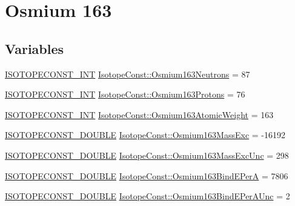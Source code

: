 \hypertarget{group___isotope_const-_osmium-_os163}{}\section{Osmium 163}
\label{group___isotope_const-_osmium-_os163}
\subsection*{Variables}
\begin{DoxyCompactItemize}
\item 
\mbox{\hyperlink{group___isotope_const-_macros_ga5f18360b3e99483a35c32d789e62621c}{I\+S\+O\+T\+O\+P\+E\+C\+O\+N\+S\+T\+\_\+\+I\+NT}} \mbox{\hyperlink{group___isotope_const-_osmium-_os163_ga75f1658134a2aa3621d6da50d4b6484e}{Isotope\+Const\+::\+Osmium163\+Neutrons}} = 87
\item 
\mbox{\hyperlink{group___isotope_const-_macros_ga5f18360b3e99483a35c32d789e62621c}{I\+S\+O\+T\+O\+P\+E\+C\+O\+N\+S\+T\+\_\+\+I\+NT}} \mbox{\hyperlink{group___isotope_const-_osmium-_os163_ga3ab97618a752dcfbd7f5609d349a3395}{Isotope\+Const\+::\+Osmium163\+Protons}} = 76
\item 
\mbox{\hyperlink{group___isotope_const-_macros_ga5f18360b3e99483a35c32d789e62621c}{I\+S\+O\+T\+O\+P\+E\+C\+O\+N\+S\+T\+\_\+\+I\+NT}} \mbox{\hyperlink{group___isotope_const-_osmium-_os163_ga7a96915f52f36a850fb20954eb4883ed}{Isotope\+Const\+::\+Osmium163\+Atomic\+Weight}} = 163
\item 
\mbox{\hyperlink{group___isotope_const-_macros_ga8f45a7272ce02c0b4c65c44636ed719a}{I\+S\+O\+T\+O\+P\+E\+C\+O\+N\+S\+T\+\_\+\+D\+O\+U\+B\+LE}} \mbox{\hyperlink{group___isotope_const-_osmium-_os163_ga13b33f42e049f05ee7041526cd588dcc}{Isotope\+Const\+::\+Osmium163\+Mass\+Exc}} = -\/16192
\item 
\mbox{\hyperlink{group___isotope_const-_macros_ga8f45a7272ce02c0b4c65c44636ed719a}{I\+S\+O\+T\+O\+P\+E\+C\+O\+N\+S\+T\+\_\+\+D\+O\+U\+B\+LE}} \mbox{\hyperlink{group___isotope_const-_osmium-_os163_gaa118f68becfa0de133e3e733c71ae832}{Isotope\+Const\+::\+Osmium163\+Mass\+Exc\+Unc}} = 298
\item 
\mbox{\hyperlink{group___isotope_const-_macros_ga8f45a7272ce02c0b4c65c44636ed719a}{I\+S\+O\+T\+O\+P\+E\+C\+O\+N\+S\+T\+\_\+\+D\+O\+U\+B\+LE}} \mbox{\hyperlink{group___isotope_const-_osmium-_os163_ga3dfd12555121cdc8e0be658aff8a1bd9}{Isotope\+Const\+::\+Osmium163\+Bind\+E\+PerA}} = 7806
\item 
\mbox{\hyperlink{group___isotope_const-_macros_ga8f45a7272ce02c0b4c65c44636ed719a}{I\+S\+O\+T\+O\+P\+E\+C\+O\+N\+S\+T\+\_\+\+D\+O\+U\+B\+LE}} \mbox{\hyperlink{group___isotope_const-_osmium-_os163_ga8abb187e9a6d3943c923401e98f09b06}{Isotope\+Const\+::\+Osmium163\+Bind\+E\+Per\+A\+Unc}} = 2

\end{DoxyCompactItemize}
